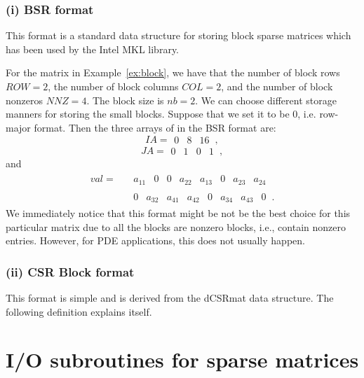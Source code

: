 \documentclass[11pt]{memoir}
\begin{document}
\subsubsection*{(i) BSR format}
This format is a standard data structure for storing block sparse matrices which has been used by the Intel MKL library. 
%

%

For the matrix in Example~\ref{ex:block}, we have that the number of block rows $ROW=2$, the number of block columns $COL=2$, and the number of block nonzeros $NNZ = 4$. The block size is $nb = 2$. We can choose different storage manners for storing the small blocks. Suppose that we set it to be 0, i.e. row-major format. Then the three arrays of in the BSR format are:
$$
IA =
\begin{array}{||c||c||c||c||}0&8&16\end{array}\, ,
$$
$$
JA =
\begin{array}{||c|c||c|c||}
0&1&0&1\end{array}\, ,
$$
and
\begin{align*}
val = \;\; &
\begin{array}{||c|c|c|c||c|c|c|c||}
a_{11} & 0 & 0 & a_{22} & a_{13} & 0 & a_{23} & a_{24}
\end{array}\,
\\
& \begin{array}{||c|c|c|c||c|c|c|c||}
0 & a_{32} & a_{41} & a_{42} & 0 & a_{34} & a_{43} & 0
\end{array}\,.
\end{align*}
We immediately notice that this format might be not be the best choice for this particular matrix due to all the blocks are nonzero blocks, i.e., contain nonzero entries. However, for PDE applications, this does not usually happen. 

\subsubsection*{(ii) CSR Block format}
This format is simple and is derived from the dCSRmat data structure. The following definition explains itself. 
%

%

\section{I/O subroutines for sparse matrices}
\end{document}
